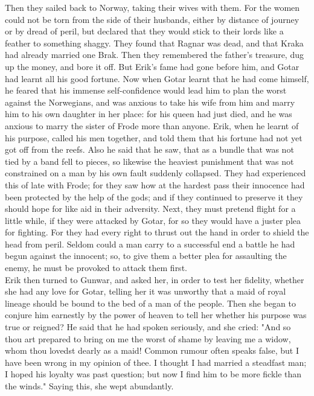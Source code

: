 \documentclass[10pt,a4paper]{report}
\begin{document}
Then they sailed back to Norway, taking their wives with them. For the women could not be torn from the side of their husbands, either by distance of journey or by dread of peril, but declared that they would stick to their lords like a feather to something shaggy. They found that Ragnar was dead, and that Kraka had already married one Brak. Then they remembered the father's treasure, dug up the money, and bore it off. But Erik's fame had gone before him, and Gotar had learnt all his good fortune. Now when Gotar learnt that he had come himself, he feared that his immense self-confidence would lead him to plan the worst against the Norwegians, and was anxious to take his wife from him and marry him to his own daughter in her place: for his queen had just died, and he was anxious to marry the sister of Frode more than anyone. Erik, when he learnt of his purpose, called his men together, and told them that his fortune had not yet got off from the reefs. Also he said that he saw, that as a bundle that was not tied by a band fell to pieces, so likewise the heaviest punishment that was not constrained on a man by his own fault suddenly collapsed. They had experienced this of late with Frode; for they saw how at the hardest pass their innocence had been protected by the help of the gods; and if they continued to preserve it they should hope for like aid in their adversity. Next, they must pretend flight for a little while, if they were attacked by Gotar, for so they would have a juster plea for fighting. For they had every right to thrust out the hand in order to shield the head from peril. Seldom could a man carry to a successful end a battle he had begun against the innocent; so, to give them a better plea for assaulting the enemy, he must be provoked to attack them first.\\

Erik then turned to Gunwar, and asked her, in order to test her fidelity, whether she had any love for Gotar, telling her it was unworthy that a maid of royal lineage should be bound to the bed of a man of the people. Then she began to conjure him earnestly by the power of heaven to tell her whether his purpose was true or reigned? He said that he had spoken seriously, and she cried: "And so thou art prepared to bring on me the worst of shame by leaving me a widow, whom thou lovedst dearly as a maid! Common rumour often speaks false, but I have been wrong in my opinion of thee. I thought I had married a steadfast man; I hoped his loyalty was past question; but now I find him to be more fickle than the winds." Saying this, she wept abundantly.\\
\end{document}
